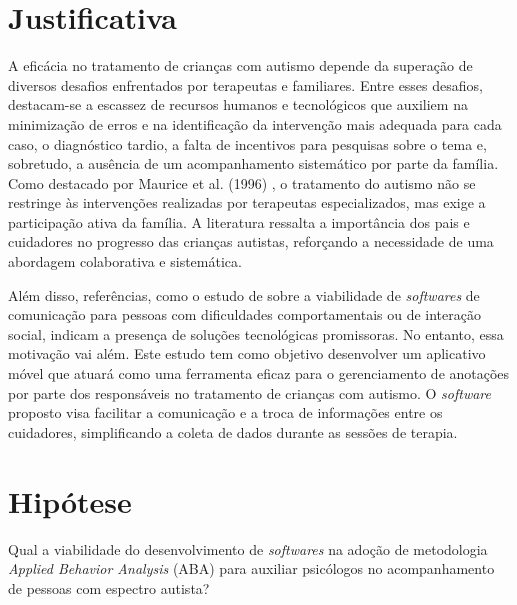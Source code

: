 \section{Justificativa}
    

A eficácia no tratamento de crianças com autismo depende da superação de diversos desafios 
enfrentados por terapeutas e familiares. Entre esses desafios, destacam-se a escassez de 
recursos humanos e tecnológicos que auxiliem na minimização de erros e na identificação da 
intervenção mais adequada para cada caso, o diagnóstico tardio, a falta de incentivos para 
pesquisas sobre o tema e, sobretudo, a ausência de um acompanhamento sistemático por parte 
da família. Como destacado por Maurice et al. (1996) \cite{maurice1996behavioral}, o tratamento 
do autismo não se restringe às intervenções realizadas por terapeutas especializados, mas exige 
a participação ativa da família. A literatura ressalta a importância dos pais e cuidadores no 
progresso das crianças autistas, reforçando a necessidade de uma abordagem colaborativa e sistemática.


Além disso, referências, como o estudo de \cite{artoni2011accessible} sobre a viabilidade de 
\textit{softwares} de comunicação para pessoas com dificuldades comportamentais ou de interação 
social, indicam a presença de soluções tecnológicas promissoras. No entanto, essa motivação vai 
além. Este estudo tem como objetivo desenvolver um aplicativo móvel que atuará como uma ferramenta 
eficaz para o gerenciamento de anotações por parte dos responsáveis no tratamento de crianças com 
autismo. O \textit{software} proposto visa facilitar a comunicação e a troca de informações entre 
os cuidadores, simplificando a coleta de dados durante as sessões de terapia.


\section{Hipótese}
     Qual a viabilidade do desenvolvimento de \textit{softwares} na adoção de metodologia 
     \textit{Applied Behavior Analysis} (ABA) para auxiliar psicólogos no acompanhamento de 
     pessoas com espectro autista?
